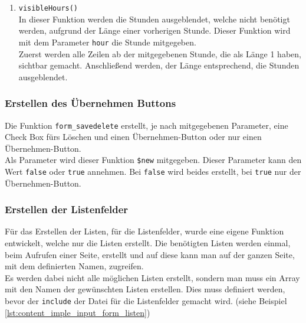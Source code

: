 \begin{enumerate}
	\item \texttt{visibleHours()}\\
	In dieser Funktion werden die Stunden ausgeblendet, welche nicht benötigt werden, aufgrund der Länge einer vorherigen Stunde. Dieser Funktion wird mit dem Parameter \texttt{hour} die Stunde mitgegeben.\\
	Zuerst werden alle Zeilen ab der mitgegebenen Stunde, die als Länge 1 haben, sichtbar gemacht. Anschließend werden, der Länge entsprechend, die Stunden ausgeblendet.
	
	
	
\end{enumerate}

\subsubsection{Erstellen des Übernehmen Buttons}
Die Funktion \texttt{form\_savedelete} erstellt, je nach mitgegebenen Parameter, eine Check Box fürs Löschen und einen Übernehmen-Button oder nur einen Übernehmen-Button.\\
Als Parameter wird dieser Funktion \texttt{\$new} mitgegeben. Dieser Parameter kann den Wert \texttt{false} oder \texttt{true} annehmen. Bei \texttt{false} wird beides erstellt, bei \texttt{true} nur der Übernehmen-Button.


\subsubsection{Erstellen der Listenfelder}
Für das Erstellen der Listen, für die Listenfelder, wurde eine eigene Funktion entwickelt, welche nur die Listen erstellt. Die benötigten Listen werden einmal, beim Aufrufen einer Seite, erstellt und auf diese kann man auf der ganzen Seite, mit dem definierten Namen, zugreifen.\\
Es werden dabei nicht alle möglichen Listen erstellt, sondern man muss ein Array mit den Namen der gewünschten Listen erstellen. Dies muss definiert werden, bevor der \texttt{include} der Datei für die Listenfelder gemacht wird. (siehe Beispiel \autoref{lst:content_imple_input_form_listen})


